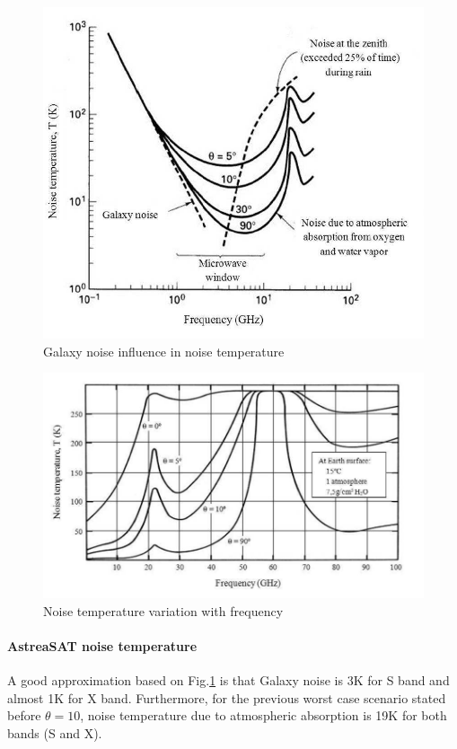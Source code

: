 \begin{figure}[H]
	\includegraphics[scale=0.5]{./sections/SatelliteDept/sections/images/NoiseTemperature}
	\centering
	\caption{Galaxy noise influence in noise temperature \cite{Jorge2012}}
	\label{NoiseTemperature}
\end{figure}
\begin{figure}[h]
	\includegraphics[scale=0.55]{./sections/SatelliteDept/sections/images/NoiseTemperature2}
	\centering
	\caption{Noise temperature variation with frequency \cite{Jorge2012}}
	\label{NoiseTemperature2}
\end{figure}

\paragraph{AstreaSAT noise temperature} A good approximation based on Fig.\ref{NoiseTemperature} is that Galaxy noise is 3K for S band and almost 1K for X band. Furthermore, for the previous worst case scenario stated before $\theta=10$, noise temperature due to atmospheric absorption is 19K for both bands (S and X).

